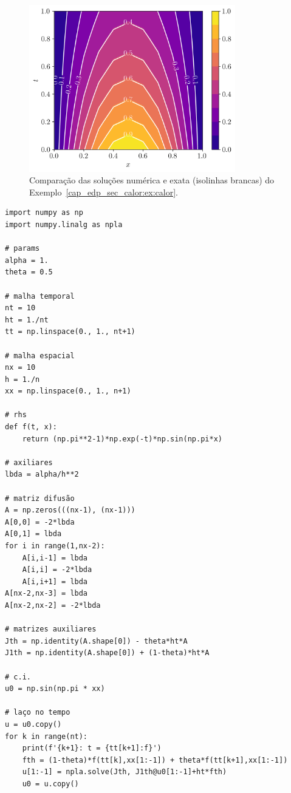 \begin{ex}
  \begin{figure}[H]
    \centering
    \includegraphics[width=0.8\textwidth]{./cap_edp/dados/fig_ex_calor/fig_contour}
    \caption{Comparação das soluções numérica e exata (isolinhas brancas) do Exemplo~\ref{cap_edp_sec_calor:ex:calor}.}
    \label{cap_edp_sec_calor:fig:ex_calor_contour}
  \end{figure}

\begin{lstlisting}[caption=calor.py]
import numpy as np
import numpy.linalg as npla

# params
alpha = 1.
theta = 0.5

# malha temporal
nt = 10
ht = 1./nt
tt = np.linspace(0., 1., nt+1)

# malha espacial
nx = 10
h = 1./n
xx = np.linspace(0., 1., n+1)

# rhs
def f(t, x):
    return (np.pi**2-1)*np.exp(-t)*np.sin(np.pi*x)

# axiliares
lbda = alpha/h**2

# matriz difusão
A = np.zeros(((nx-1), (nx-1)))
A[0,0] = -2*lbda
A[0,1] = lbda
for i in range(1,nx-2):
    A[i,i-1] = lbda
    A[i,i] = -2*lbda
    A[i,i+1] = lbda
A[nx-2,nx-3] = lbda
A[nx-2,nx-2] = -2*lbda

# matrizes auxiliares
Jth = np.identity(A.shape[0]) - theta*ht*A
J1th = np.identity(A.shape[0]) + (1-theta)*ht*A

# c.i.
u0 = np.sin(np.pi * xx)

# laço no tempo
u = u0.copy()
for k in range(nt):    
    print(f'{k+1}: t = {tt[k+1]:f}')
    fth = (1-theta)*f(tt[k],xx[1:-1]) + theta*f(tt[k+1],xx[1:-1])
    u[1:-1] = npla.solve(Jth, J1th@u0[1:-1]+ht*fth)
    u0 = u.copy()    
\end{lstlisting}
\end{ex}

